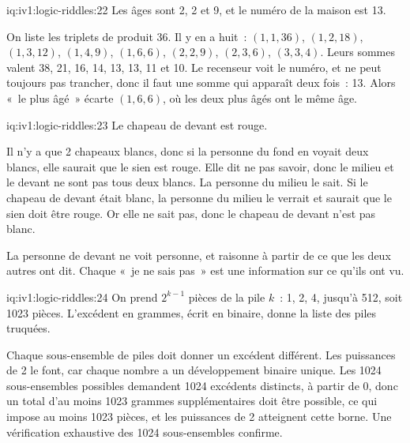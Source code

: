 \enlargethispage{-3\baselineskip}%
\begin{solution}{iq:iv1:logic-riddles:22}
Les âges sont 2, 2 et 9, et le numéro de la maison est 13.

On liste les triplets de produit 36. Il y en a huit~: $(1, 1, 36)$, $(1, 2, 18)$, $(1, 3, 12)$, $(1, 4, 9)$, $(1, 6, 6)$, $(2, 2, 9)$, $(2, 3, 6)$, $(3, 3, 4)$. Leurs sommes valent 38, 21, 16, 14, 13, 13, 11 et 10. Le recenseur voit le numéro, et ne peut toujours pas trancher, donc il faut une somme qui apparaît deux fois~: 13. Alors «~le plus âgé~» écarte $(1, 6, 6)$, où les deux plus âgés ont le même âge.

\end{solution}

\begin{solution}{iq:iv1:logic-riddles:23}
Le chapeau de devant est rouge.

Il n'y a que 2 chapeaux blancs, donc si la personne du fond en voyait deux blancs, elle saurait que le sien est rouge. Elle dit ne pas savoir, donc le milieu et le devant ne sont pas tous deux blancs. La personne du milieu le sait. Si le chapeau de devant était blanc, la personne du milieu le verrait et saurait que le sien doit être rouge. Or elle ne sait pas, donc le chapeau de devant n'est pas blanc.

La personne de devant ne voit personne, et raisonne à partir de ce que les deux autres ont dit. Chaque «~je ne sais pas~» est une information sur ce qu'ils ont vu.

\end{solution}

\begin{solution}{iq:iv1:logic-riddles:24}
On prend $2^{k - 1}$ pièces de la pile $k$~: 1, 2, 4, jusqu'à 512, soit 1023 pièces. L'excédent en grammes, écrit en binaire, donne la liste des piles truquées.

Chaque sous-ensemble de piles doit donner un excédent différent. Les puissances de 2 le font, car chaque nombre a un développement binaire unique. Les 1024 sous-ensembles possibles demandent 1024 excédents distincts, à partir de 0, donc un total d'au moins 1023 grammes supplémentaires doit être possible, ce qui impose au moins 1023 pièces, et les puissances de 2 atteignent cette borne. Une vérification exhaustive des 1024 sous-ensembles confirme.

\end{solution}

